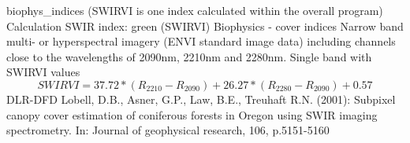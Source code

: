%
{ %
biophys\_indices (SWIRVI is one index calculated within the overall program)
}
%
{ %
Calculation SWIR index: green (SWIRVI)
}
%
{ %
Biophysics - cover indices
}
%
{ %
Narrow band multi- or hyperspectral imagery (ENVI standard image data) including channels close to the wavelengths of 2090nm, 2210nm and 2280nm.\bigskip
}
%
{ %
Single band with SWIRVI values
}
%
{ %
\begin{displaymath}
SWIRVI = 37.72 * (R_{2210}-R_{2090}) +26.27 * (R_{2280} - R_{2090}) +0.57
\end{displaymath}
}
%
{ %
DLR-DFD
}
%
{ %
Lobell, D.B., Asner, G.P., Law, B.E., Treuhaft R.N. (2001): Subpixel canopy cover estimation of coniferous forests in Oregon using SWIR imaging spectrometry. In: Journal of geophysical research, 106, p.5151-5160
}
